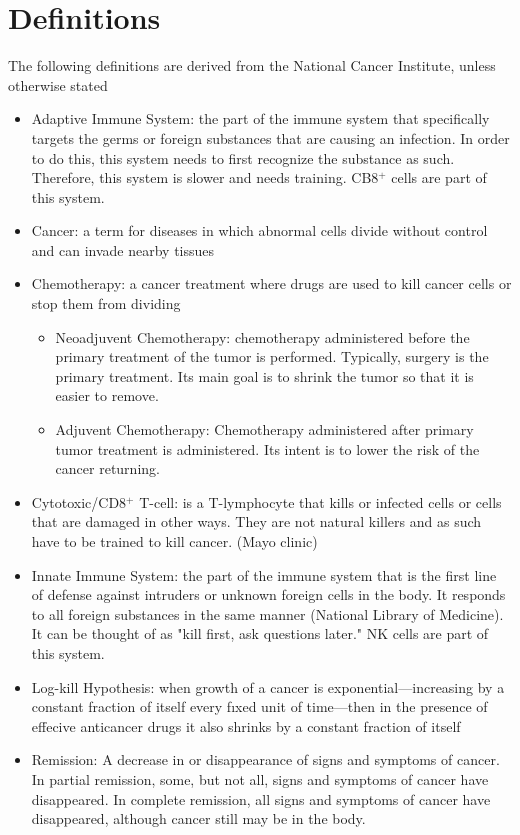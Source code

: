 \documentclass[11pt]{amsart}
\begin{document}
\newpage

\appendix
\section{Definitions}
\label{appendix: defs}
The following definitions are derived from the National Cancer Institute, unless otherwise stated
\begin{itemize}
	\item Adaptive Immune System: the part of the immune system that specifically targets the germs or foreign substances that are causing an infection. In order to do this, this system needs to first recognize the substance as such. Therefore, this system is slower and needs training. CB8$^+$ cells are part of this system.
	\item Cancer:  a term for diseases in which abnormal cells divide without control and can invade nearby tissues
	\item Chemotherapy: a cancer treatment where drugs are used to kill cancer cells or stop them from dividing
		\begin{itemize}
			\item Neoadjuvent Chemotherapy: chemotherapy administered before the primary treatment of the tumor is performed. Typically, surgery is the primary treatment. Its main goal is to shrink the tumor so that it is easier to remove.
			\item Adjuvent Chemotherapy: Chemotherapy administered after primary tumor treatment is administered. Its intent is to lower the risk of the cancer returning.
		\end{itemize}
	\item Cytotoxic/CD8$^+$ T-cell: is a T-lymphocyte that kills or infected cells or cells that are damaged in other ways. They are not natural killers and as such have to be trained to kill cancer. (Mayo clinic)
	\item Innate Immune System: the part of the immune system that is the first line of defense against intruders or unknown foreign cells in the body. It responds to all foreign substances in the same manner (National Library of Medicine). It can be thought of as "kill first, ask questions later." NK cells are part of this system.
	\item Log-kill Hypothesis: when growth of a cancer is exponential—increasing by a constant fraction of itself every fıxed unit of time—then in the presence of effecive anticancer drugs it also shrinks by a constant fraction \cite{LogKill}
of itself
	\item Remission: A decrease in or disappearance of signs and symptoms of cancer. In partial remission, some, but not all, signs and symptoms of cancer have disappeared. In complete remission, all signs and symptoms of cancer have disappeared, although cancer still may be in the body.

\end{itemize}
\end{document}
